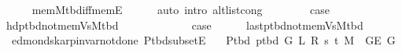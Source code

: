 \begin{isabellebody}
\ \ \ \ \isamarkupfalse%
\ mem{\isacharunderscore}{\kern0pt}M{\isacharunderscore}{\kern0pt}tbd{\isacharunderscore}{\kern0pt}iff{\isacharunderscore}{\kern0pt}mem{\isacharunderscore}{\kern0pt}E{}\isanewline
\ \ \ \ \isamarkupfalse%
\ {\isacharparenleft}{\kern0pt}auto\ intro{\isacharcolon}{\kern0pt}\ alt{\isacharunderscore}{\kern0pt}list{\isacharunderscore}{\kern0pt}cong{\isacharparenright}{\kern0pt}\isanewline
{}\isamarkupfalse%
\isanewline
\ \ \isamarkupfalse%
\ {}\isanewline
\ \ \isamarkupfalse%
\ {\isacharquery}{\kern0pt}case\isanewline
\ \ \ \ \isamarkupfalse%
\ hd{\isacharunderscore}{\kern0pt}p{\isacharunderscore}{\kern0pt}tbd{\isacharunderscore}{\kern0pt}not{\isacharunderscore}{\kern0pt}mem{\isacharunderscore}{\kern0pt}Vs{\isacharunderscore}{\kern0pt}M{\isacharunderscore}{\kern0pt}tbd\isanewline
\ \ \ \ \isacommand{{\isachardot}{\kern0pt}}\isamarkupfalse%
\isanewline
{}\isamarkupfalse%
\isanewline
\ \ \isamarkupfalse%
\ {}\isanewline
\ \ \isamarkupfalse%
\ {\isacharquery}{\kern0pt}case\isanewline
\ \ \ \ \isamarkupfalse%
\ last{\isacharunderscore}{\kern0pt}p{\isacharunderscore}{\kern0pt}tbd{\isacharunderscore}{\kern0pt}not{\isacharunderscore}{\kern0pt}mem{\isacharunderscore}{\kern0pt}Vs{\isacharunderscore}{\kern0pt}M{\isacharunderscore}{\kern0pt}tbd\isanewline
\ \ \ \ \isacommand{{\isachardot}{\kern0pt}}\isamarkupfalse%
\isanewline
{}\isamarkupfalse%
%
\endisatagproof
{\isafoldproof}%
%
\isadelimproof
\isanewline
%
\endisadelimproof
%
\isadeliminvisible
\isanewline
%
\endisadeliminvisible
%
\isataginvisible
{}\isamarkupfalse%
\ {\isacharparenleft}{\kern0pt}\ edmonds{\isacharunderscore}{\kern0pt}karp{\isacharunderscore}{\kern0pt}invar{\isacharunderscore}{\kern0pt}not{\isacharunderscore}{\kern0pt}done{\isacharunderscore}{\kern0pt}{}{\isacharparenright}{\kern0pt}\ P{\isacharunderscore}{\kern0pt}tbd{\isacharunderscore}{\kern0pt}subset{\isacharunderscore}{\kern0pt}E{\isacharcolon}{\kern0pt}\isanewline
\ \ \ {\isachardoublequoteopen}P{\isacharunderscore}{\kern0pt}tbd\ {\isacharparenleft}{\kern0pt}p{\isacharunderscore}{\kern0pt}tbd\ G\ L\ R\ s\ t\ M{\isacharparenright}{\kern0pt}\ {\isasymsubseteq}\ G{\isachardot}{\kern0pt}E\ G{\isachardoublequoteclose}%
\endisataginvisible
{\isafoldinvisible}%
%
\isadeliminvisible
\isanewline
%
\endisadeliminvisible
%
\isadelimproof
%
\endisadelimproof

\end{isabellebody}
